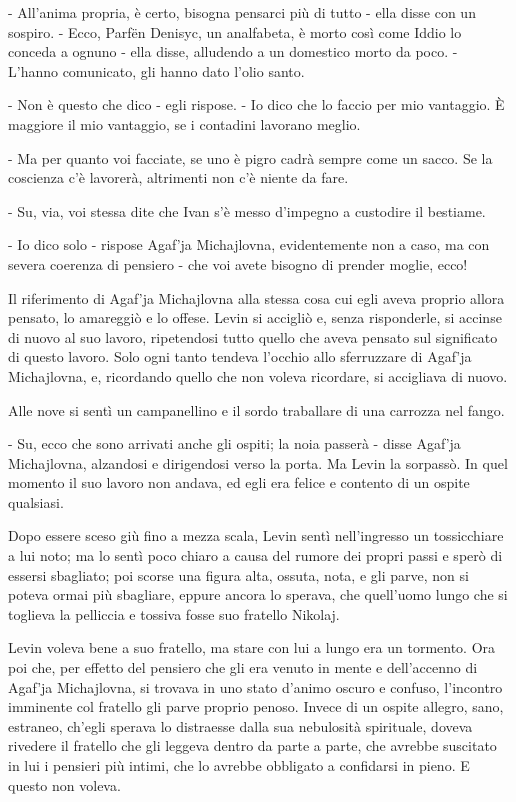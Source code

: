 - All'anima propria, è certo, bisogna pensarci più di tutto - ella disse con un sospiro. - Ecco, Parfën Denisyc, un analfabeta, è morto così come Iddio lo conceda a ognuno - ella disse, alludendo a un domestico morto da poco. - L'hanno comunicato, gli hanno dato l'olio santo. 

- Non è questo che dico - egli rispose. - Io dico che lo faccio per mio vantaggio. È maggiore il mio vantaggio, se i contadini lavorano meglio. 

- Ma per quanto voi facciate, se uno è pigro cadrà sempre come un sacco. Se la coscienza c'è lavorerà, altrimenti non c'è niente da fare. 

- Su, via, voi stessa dite che Ivan s'è messo d'impegno a custodire il bestiame. 

- Io dico solo - rispose Agaf'ja Michajlovna, evidentemente non a caso, ma con severa coerenza di pensiero - che voi avete bisogno di prender moglie, ecco! 

Il riferimento di Agaf'ja Michajlovna alla stessa cosa cui egli aveva proprio allora pensato, lo amareggiò e lo offese. Levin si accigliò e, senza risponderle, si accinse di nuovo al suo lavoro, ripetendosi tutto quello che aveva pensato sul significato di questo lavoro. Solo ogni tanto tendeva l'occhio allo sferruzzare di Agaf'ja Michajlovna, e, ricordando quello che non voleva ricordare, si accigliava di nuovo. 

Alle nove si sentì un campanellino e il sordo traballare di una carrozza nel fango. 

- Su, ecco che sono arrivati anche gli ospiti; la noia passerà - disse Agaf'ja Michajlovna, alzandosi e dirigendosi verso la porta. Ma Levin la sorpassò. In quel momento il suo lavoro non andava, ed egli era felice e contento di un ospite qualsiasi. 

Dopo essere sceso giù fino a mezza scala, Levin sentì nell'ingresso un tossicchiare a lui noto; ma lo sentì poco chiaro a causa del rumore dei propri passi e sperò di essersi sbagliato; poi scorse una figura alta, ossuta, nota, e gli parve, non si poteva ormai più sbagliare, eppure ancora lo sperava, che quell'uomo lungo che si toglieva la pelliccia e tossiva fosse suo fratello Nikolaj. 

Levin voleva bene a suo fratello, ma stare con lui a lungo era un tormento. Ora poi che, per effetto del pensiero che gli era venuto in mente e dell'accenno di Agaf'ja Michajlovna, si trovava in uno stato d'animo oscuro e confuso, l'incontro imminente col fratello gli parve proprio penoso. Invece di un ospite allegro, sano, estraneo, ch'egli sperava lo distraesse dalla sua nebulosità spirituale, doveva rivedere il fratello che gli leggeva dentro da parte a parte, che avrebbe suscitato in lui i pensieri più intimi, che lo avrebbe obbligato a confidarsi in pieno. E questo non voleva. 

